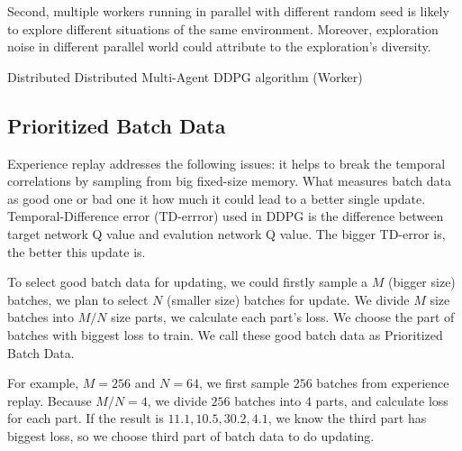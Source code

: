\documentclass[11pt,twocolumn]{jarticle} %
\begin{document}
Second, multiple workers running in parallel with different random seed is likely to explore different situations of the same environment. Moreover, exploration noise in different parallel world could attribute to the exploration's diversity. \par

\begin{algorithm*}[h]
\caption{Distributed Distributed Multi-Agent DDPG algorithm (Worker)}
\begin{algorithmic}
    \EndFor
  \EndFor
\EndFor
\end{algorithmic}
\end{algorithm*}

\subsection{Prioritized Batch Data}

Experience replay addresses the following issues: it helps to break the temporal correlations by sampling from big fixed-size memory. What measures batch data as good one or bad one it how much it could lead to a better single update. Temporal-Difference error (TD-errror) used in DDPG is the difference between target network Q value and evalution network Q value. The bigger TD-error is, the better this update is. \par

To select good batch data for updating, we could firstly sample a $M$ (bigger size) batches, we plan to select $N$ (smaller size) batches for update. We divide $M$ size batches into $M/N$ size parts, we calculate each part's loss. We choose the part of batches with biggest loss to train. We call these good batch data as Prioritized Batch Data. \par

For example, $M = 256$ and $N = 64$, we first sample $256$ batches from experience replay. Because $M / N = 4$, we divide $256$ batches into $4$ parts, and calculate loss for each part. If the result is {$11.1, 10.5, 30.2, 4.1$}, we know the third part has biggest loss, so we choose third part of batch data to do updating. 
\end{document}
